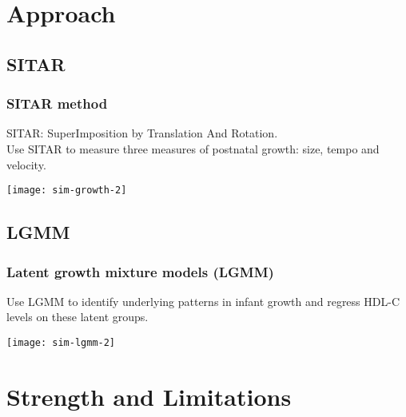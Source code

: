 \documentclass[10pt]{beamer}\usepackage[]{graphicx}\usepackage[]{color}
\begin{document}
\section{Approach}

\subsection{SITAR}
\begin{frame}
\frametitle{SITAR method}
SITAR: SuperImposition by Translation And Rotation.\\
\smallskip
Use SITAR to measure three measures of postnatal growth: size, tempo and velocity.
\smallskip

\centering
\texttt{[image: sim-growth-2]}
\end{frame}

\subsection{LGMM}
\begin{frame}
\frametitle{Latent growth mixture models (LGMM)}
Use LGMM to identify underlying patterns in infant growth and regress HDL-C levels on these latent groups.

\centering
\texttt{[image: sim-lgmm-2]}
\end{frame}

\section{Strength and Limitations}
\end{document}

